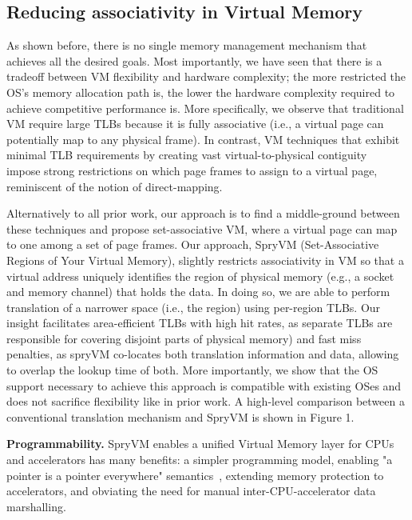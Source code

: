 

\subsection{Reducing associativity in Virtual Memory}

As shown before, there is no single memory management mechanism that achieves all the desired goals. Most importantly, we have seen that there is a tradeoff between VM flexibility and hardware complexity; the more restricted the OS's memory allocation path is, the lower the hardware complexity required to achieve competitive performance is. More specifically, we observe that traditional VM require large TLBs because it is fully associative (i.e., a virtual page can potentially map to any physical frame). In contrast, VM techniques that exhibit minimal TLB requirements by creating vast virtual-to-physical contiguity~\cite{basu:efficient, gandhi:range, haria:devirtualizing} impose strong restrictions on which page frames to assign to a virtual page, reminiscent of the notion of direct-mapping. 

Alternatively to all prior work, our approach is to find a middle-ground between these techniques and propose set-associative VM, where a virtual page can map to one among a set of page frames. 
Our approach, SpryVM (Set-Associative Regions of Your Virtual Memory), slightly restricts associativity in VM so that a virtual address uniquely identifies the region of physical memory (e.g., a socket and memory channel) that holds the data. In doing so, we are able to perform translation of a narrower space (i.e., the region) using per-region TLBs. Our insight facilitates area-efficient TLBs with high hit rates, as separate TLBs are responsible for covering disjoint parts of physical memory) and fast miss penalties, as spryVM co-locates both translation information and data, allowing to overlap the lookup time of both. More importantly, we show that the OS support necessary to achieve this approach is compatible with existing OSes and does not sacrifice flexibility like in prior work. A high-level comparison between a conventional translation mechanism and SpryVM is shown in Figure 1.

\noindent\textbf{Programmability.} SpryVM enables a unified Virtual Memory layer for CPUs and accelerators has many benefits: a simpler programming model, enabling "a pointer is a pointer everywhere" semantics~\cite{pichai:architectural, power:supporting, vesely:observation}, extending memory protection to accelerators, and obviating the need for manual inter-CPU-accelerator data marshalling.  

